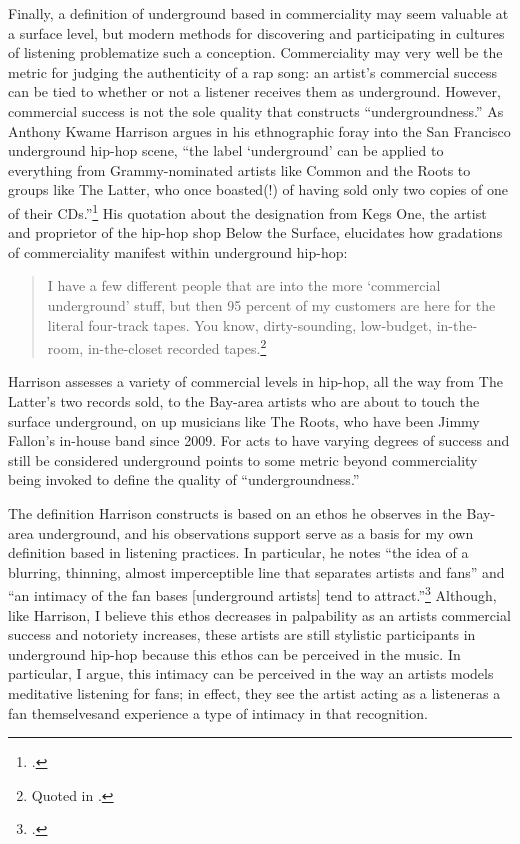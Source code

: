 Finally, a definition of underground based in commerciality may seem valuable at a surface level, but modern
methods for discovering and participating in cultures of listening problematize such a conception. Commerciality
may very well be the metric for judging the authenticity of a rap song: an artist's commercial success can be tied to
whether or not a listener receives them as underground. However, commercial success is not the sole quality that
constructs ``undergroundness.'' As Anthony Kwame Harrison argues in his ethnographic foray into the San Francisco
underground hip-hop scene, ``the label `underground' can be applied to everything from Grammy-nominated artists like
Common and the Roots to groups like The Latter, who once boasted(!) of having sold only two copies of one of their
CDs.''\footnote{
    \autocite[9]{anthonykwameharrisonHipHopUnderground2009}.}
His quotation about the designation from Kegs One, the artist and proprietor of the hip-hop shop Below the Surface, 
elucidates how gradations of commerciality manifest within underground hip-hop:
    \begin{quote}
        I have a few different people that are into the more `commercial underground' stuff, but then 95 percent of my
        customers are here for the  literal four-track tapes. You know, dirty-sounding, low-budget, in-the-room, in-the-closet
        recorded tapes.\footnote{
        Quoted in \autocite[10]{anthonykwameharrisonHipHopUnderground2009}.}
    \end{quote}
Harrison assesses a variety of commercial levels in hip-hop, all the way from The Latter's two records sold, to 
the Bay-area artists who are about to touch the surface underground, on up musicians like The Roots, who have been 
Jimmy Fallon's in-house band since 2009. For acts to have varying degrees of success and still be considered 
underground points to some metric beyond commerciality being invoked to define the quality of ``undergroundness.''

The definition Harrison constructs is based on an ethos he observes in the Bay-area underground, and his observations
support serve as a basis for my own definition based in listening practices. In particular, he notes ``the idea of a
blurring, thinning, almost imperceptible line that separates artists and fans'' and ``an intimacy of the fan bases
[underground artists] tend to attract.''\footnote{
    \autocite[10--11]{anthonykwameharrisonHipHopUnderground2009}.}
Although, like Harrison, I believe this ethos decreases in palpability as an artists commercial success and notoriety
increases, these artists are still stylistic participants in underground hip-hop because this ethos can be perceived
in the music. In particular, I argue, this intimacy can be perceived in the way an artists models meditative listening
for fans; in effect, they see the artist acting as a listener\textemdash as a fan themselves\textemdash and experience
a type of intimacy in that recognition.

